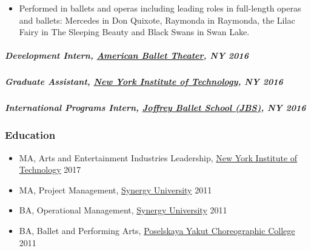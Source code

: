 \documentclass[
  letterpaper,
  DIV=11,
  numbers=noendperiod]{scrartcl}
\let\oldsubparagraph\subparagraph
\renewcommand{\subparagraph}[1]{\oldsubparagraph{#1}\mbox{}}
\providecommand{\tightlist}{%
  \setlength{\itemsep}{0pt}\setlength{\parskip}{0pt}}\usepackage{longtable,booktabs,array}
\begin{document}
\begin{itemize}
\tightlist
\item
  Performed in ballets and operas including leading roles in full-length
  operas and ballets: Mercedes in Don Quixote, Raymonda in Raymonda, the
  Lilac Fairy in The Sleeping Beauty and Black Swans in Swan Lake.
\end{itemize}

\subparagraph{\texorpdfstring{{Development Intern},
\href{https://www.abt.org/}{American Ballet Theater}, NY
{2016}}{Development Intern, American Ballet Theater, NY 2016}}\label{development-intern-american-ballet-theater-ny-2016}

\subparagraph{\texorpdfstring{{Graduate Assistant},
\href{https://www.nyit.edu/news/features/internship_spotlight_meet_irina_lapteva}{New
York Institute of Technology}, NY
{2016}}{Graduate Assistant, New York Institute of Technology, NY 2016}}\label{graduate-assistant-new-york-institute-of-technology-ny-2016}

\subparagraph{\texorpdfstring{{International Programs Intern},
\href{https://www.joffreyballetschool.com/}{Joffrey Ballet School
(JBS)}, NY
{2016}}{International Programs Intern, Joffrey Ballet School (JBS), NY 2016}}\label{international-programs-intern-joffrey-ballet-school-jbs-ny-2016}

\subsubsection{Education}\label{education}

\begin{itemize}
\tightlist
\item
  {MA}, Arts and Entertainment Industries Leadership,
  \href{https://www.nyit.edu/}{New York Institute of Technology} {2017}
\item
  {MA}, Project Management, \href{https://synergy.university/}{Synergy
  University} {2011}
\item
  {BA}, Operational Management,
  \href{https://synergy.university/}{Synergy University} {2011}
\item
  {BA}, Ballet and Performing Arts,
  \href{https://sakha-ballet.ru/en/}{Poselskaya Yakut Choreographic
  College} {2011}
\end{itemize}
\end{document}
